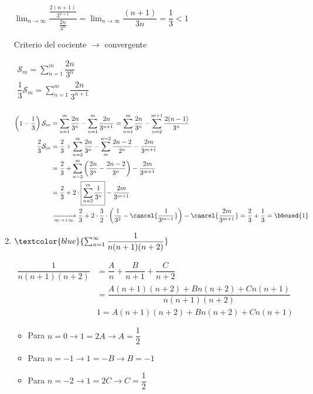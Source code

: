 \begin{enumerate}[label=\color{red}\alph*)]
	$\lim_{n\to\infty}\dfrac{\frac{2(n+1)}{3^{n+1}}}{\frac{2n}{3^n}}=\lim_{n\to\infty}\dfrac{(n+1)}{3n}=\dfrac{1}{3}<1$
	
	Criterio del cociente $\longrightarrow$ convergente
	
	$\begin{array}{l}
		\mathcal{S}_m=\sum_{n=1}^{m}\dfrac{2n}{3^n}\\
		\dfrac{1}{3}\mathcal{S}_m=\sum_{n=1}^{m}\dfrac{2n}{3^{n+1}}\\ 	
		\end{array}$
		
		$\begin{aligned}
			\left(1-\dfrac{1}{3}\right)\mathcal{S}_m&=\sum_{n=1}^{m}\dfrac{2n}{3^n}-\sum_{n=1}^{m}\dfrac{2n}{3^{n+1}}=\sum_{n=1}^{m}\dfrac{2n}{3^n}-\sum_{n=2}^{m+1}\dfrac{2(n-1)}{3^n}\\
			\dfrac{2}{3}\mathcal{S}_m&=\dfrac{2}{3}+\sum_{n=2}^{m}\dfrac{2n}{3^n}-\sum_{m}^{n=2}\dfrac{2n-2}{2^n}-\dfrac{2m}{3^{m+1}}\\
			&=\dfrac{2}{3}+\sum_{n=2}^{m}\left(\dfrac{2n}{3^n}-\dfrac{2n-2}{3^n}\right)-\dfrac{2m}{3^{m+1}}\\
			&=\dfrac{2}{3}+2\cdot \boxed{\sum_{n=2}^{m}\dfrac{1}{3^n}}-\dfrac{2m}{3^{m+1}}\\
			&\xrightarrow[m\to+\infty]{}\dfrac{2}{3}+2\cdot\dfrac{3}{2}\cdot\left(\dfrac{1}{3^2}-\cancel{\dfrac{1}{3^{m-1}}}\right)-\cancel{\dfrac{2m}{3^{m+1}}}=\dfrac{2}{3}+\dfrac{1}{3}=\bboxed{1}
		\end{aligned}$
		
		\item $\textcolor{blue}{\sum_{n=1}^{\infty}\dfrac{1}{n(n+1)(n+2)}}$
		
		$\begin{aligned}
			\dfrac{1}{n(n+1)(n+2)}&=\dfrac{A}{n}+\dfrac{B}{n+1}+\dfrac{C}{n+2}\\
			&=\dfrac{A(n+1)(n+2)+Bn(n+2)+Cn(n+1)}{n(n+1)(n+2)}\\
			&1=A(n+1)(n+2)+Bn(n+2)+Cn(n+1)
		\end{aligned}$
		
		\begin{itemize}[leftmargin=*]
			\item Para $n=0\longrightarrow 1=2A\rightarrow A=\dfrac{1}{2}$
			\item Para $n=-1\longrightarrow 1=-B\rightarrow B=-1$
			\item Para $n=-2\longrightarrow1=2C\rightarrow C=\dfrac{1}{2}$
		\end{itemize}
		

\end{enumerate}
